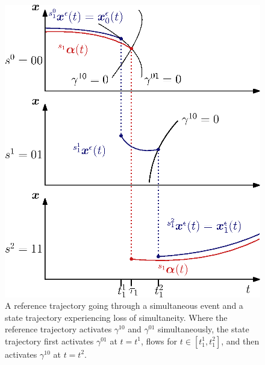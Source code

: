 \documentclass[../DC2017114Bouma.tex]{subfiles}
\begin{document}
\begin{figure}[h]
\centering
\includegraphics[width=.52\textwidth]{simulpert.eps}\caption{A reference trajectory going through a simultaneous event and a state trajectory experiencing loss of simultaneity. Where the reference trajectory activates $\gamma^{10}$ and $\gamma^{01}$ simultaneously, the state trajectory first activates $\gamma^{01}$ at $t=t^1$, flows for $t\in [t^1_1,t^2_1]$, and then activates $\gamma^{10}$ at $t=t^2$.}\label{fig:4simulpert}
\end{figure}
\end{document}
